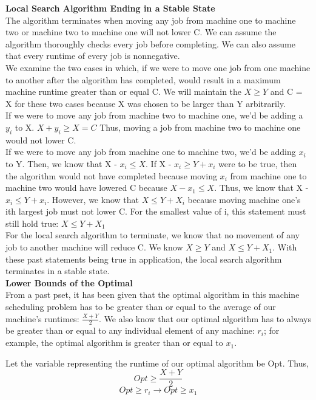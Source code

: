 \documentclass[11pt, solution, letterpaper]{format}
\begin{document}
\textbf{Local Search Algorithm Ending in a Stable State}\\
The algorithm terminates when moving any job from machine one to machine two or machine two to machine one will not lower C. We can assume the algorithm thoroughly checks every job before completing. We can also assume that every runtime of every job is nonnegative.\\

We examine the two cases in which, if we were to move one job from one machine to another after the algorithm has completed, would result in a maximum machine runtime greater than or equal C. We will maintain the $X \geq Y$ and C = X for these two cases because X was chosen to be larger than Y arbitrarily.\\


If we were to move any job from  machine two to machine one, we'd be adding a $y_i$ to X. $ X + y_i \geq X = C$ Thus, moving a job from machine two to machine one would not lower C. \\

If we were to move any job from machine one to machine two, we'd be adding $x_i$ to Y. Then, we know that X - $x_i \leq X$. If X - $x_i \geq Y + x_i$ were to be true, then the algorithm would not have completed because moving $x_i$ from machine one to machine two would have lowered C because $X - x_1 \leq X$. Thus, we know that X - $x_i \leq Y + x_i$. However, we know that $X  \leq Y + X_i$ because moving machine one's ith largest job must not lower C. For the smallest value of i, this statement must still hold true: $X  \leq Y + X_1$\\

For the local search algorithm to terminate, we know that no movement of any job to another machine will reduce C. We know $X \geq Y$ and $X \leq Y + X_1$. With these past statements being true in application, the local search algorithm terminates in a stable state.\\

\textbf{Lower Bounds of the Optimal}\\
From a past pset, it has been given that the optimal algorithm in this machine scheduling problem has to be greater than or equal to the average of our machine's runtimes: $\frac{X + Y}{2}$. We also know that our optimal algorithm has to always be greater than or equal to any individual element of any machine: $r_i$; for example, the optimal algorithm is greater than or equal to $x_1$.

Let the variable representing the runtime of our optimal algorithm be Opt. Thus,
$$ Opt \geq \frac{X + Y}{2}$$
$$ Opt \geq r_i \rightarrow Opt \geq x_1$$
\end{document}
